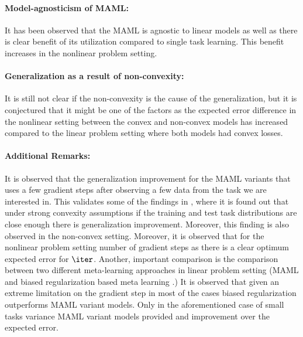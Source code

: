 \paragraph{Model-agnosticism of MAML:} It has been observed that the MAML is agnostic to linear models as well as there is clear benefit of its utilization compared to single task learning. This benefit increases in the nonlinear problem setting.

\paragraph{Generalization as a result of non-convexity:} It is still not clear if the non-convexity is the cause of the generalization, but it is conjectured that it might be one of the factors as the expected error difference in the nonlinear setting between the convex and non-convex models has increased compared to the linear problem setting where both models had convex losses.

\paragraph{Additional Remarks:} It is observed that the generalization improvement for the MAML variants that uses a few gradient steps after observing a few data from the task we are interested in. This validates some of the findings in \cite{Fallah2021}, where it is found out that under strong convexity assumptions if the training and test task distributions are close enough there is generalization improvement. Moreover, this finding is also observed in the non-convex setting. Moreover, it is observed that for the nonlinear problem setting number of gradient steps as there is a clear optimum expected error for $\iter$. Another, important comparison is the comparison between two different meta-learning approaches in linear problem setting (MAML \cite{Finn2017} and biased regularization based meta learning \cite{Denevi2018}.) It is observed that given an extreme limitation on the gradient step in most of the cases biased regularization outperforms MAML variant models. Only in the aforementioned case of small tasks variance MAML variant models provided and improvement over the expected error.



